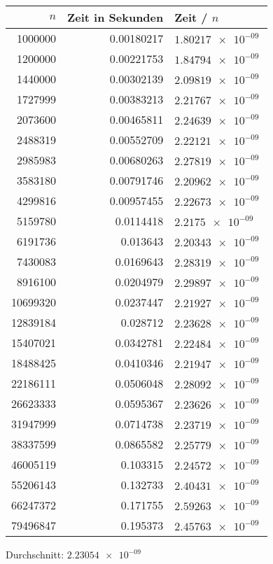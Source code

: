 \documentclass[a4paper]{scrartcl}
\begin{document}
\begin{itemize}
\begin{center}
\begin{tabular}{rrl}
$n$ & Zeit in Sekunden & Zeit / $n$\\
\hline
1000000 & 0.00180217 & $\SI{1.80217e-09}{}$\\
1200000 & 0.00221753 & $\SI{1.84794e-09}{}$\\
1440000 & 0.00302139 & $\SI{2.09819e-09}{}$\\
1727999 & 0.00383213 & $\SI{2.21767e-09}{}$\\
2073600 & 0.00465811 & $\SI{2.24639e-09}{}$\\
2488319 & 0.00552709 & $\SI{2.22121e-09}{}$\\
2985983 & 0.00680263 & $\SI{2.27819e-09}{}$\\
3583180 & 0.00791746 & $\SI{2.20962e-09}{}$\\
4299816 & 0.00957455 & $\SI{2.22673e-09}{}$\\
5159780 & 0.0114418 & $\SI{2.2175e-09}{}$\\
6191736 & 0.013643 & $\SI{2.20343e-09}{}$\\
7430083 & 0.0169643 & $\SI{2.28319e-09}{}$\\
8916100 & 0.0204979 & $\SI{2.29897e-09}{}$\\
10699320 & 0.0237447 & $\SI{2.21927e-09}{}$\\
12839184 & 0.028712 & $\SI{2.23628e-09}{}$\\
15407021 & 0.0342781 & $\SI{2.22484e-09}{}$\\
18488425 & 0.0410346 & $\SI{2.21947e-09}{}$\\
22186111 & 0.0506048 & $\SI{2.28092e-09}{}$\\
26623333 & 0.0595367 & $\SI{2.23626e-09}{}$\\
31947999 & 0.0714738 & $\SI{2.23719e-09}{}$\\
38337599 & 0.0865582 & $\SI{2.25779e-09}{}$\\
46005119 & 0.103315 & $\SI{2.24572e-09}{}$\\
55206143 & 0.132733 & $\SI{2.40431e-09}{}$\\
66247372 & 0.171755 & $\SI{2.59263e-09}{}$\\
79496847 & 0.195373 & $\SI{2.45763e-09}{}$\\
\end{tabular}
\end{center}
Durchschnitt: $\SI{2.23054e-09}{}$


\end{itemize}
\end{document}
